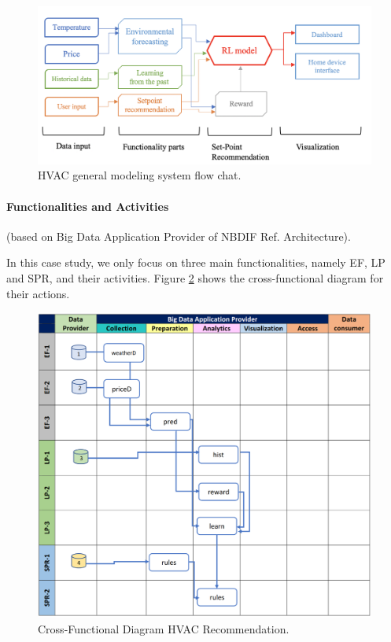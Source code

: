 \begin{figure}[htb]
\centering\includegraphics[width=1.0\columnwidth]{usecase/hvac_flowchart.png}
\caption{HVAC general modeling system flow chat.}
\label{fig:hvac_flowchart}
\end{figure}

\paragraph*{Functionalities and Activities} (based on Big Data Application Provider of NBDIF Ref. Architecture).

In this case study, we only focus on three main functionalities, namely EF, LP and SPR, and their activities. Figure \ref{fig:hvac_func_diagram} shows the cross-functional diagram for their actions.


\begin{figure}[htb]
\centering\includegraphics[width=1.0\columnwidth]{usecase/hvac_functional.png}
\caption{Cross-Functional Diagram HVAC Recommendation.}
\label{fig:hvac_func_diagram}
\end{figure}


